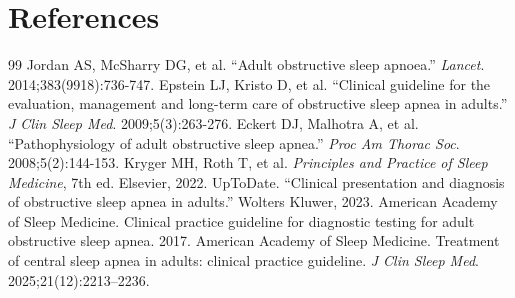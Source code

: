 \section*{References}
\begin{thebibliography}{99}
 Jordan AS, McSharry DG, et al. ``Adult obstructive sleep apnoea.'' \textit{Lancet}. 2014;383(9918):736-747.
 Epstein LJ, Kristo D, et al. ``Clinical guideline for the evaluation, management and long-term care of obstructive sleep apnea in adults.'' \textit{J Clin Sleep Med}. 2009;5(3):263-276.
 Eckert DJ, Malhotra A, et al. ``Pathophysiology of adult obstructive sleep apnea.'' \textit{Proc Am Thorac Soc}. 2008;5(2):144-153.
 Kryger MH, Roth T, et al. \textit{Principles and Practice of Sleep Medicine}, 7th ed. Elsevier, 2022.
 UpToDate. ``Clinical presentation and diagnosis of obstructive sleep apnea in adults.'' Wolters Kluwer, 2023.
 American Academy of Sleep Medicine. Clinical practice guideline for diagnostic testing for adult obstructive sleep apnea. 2017.
 American Academy of Sleep Medicine. Treatment of central sleep apnea in adults: clinical practice guideline. \textit{J Clin Sleep Med}. 2025;21(12):2213--2236.
\end{thebibliography}
